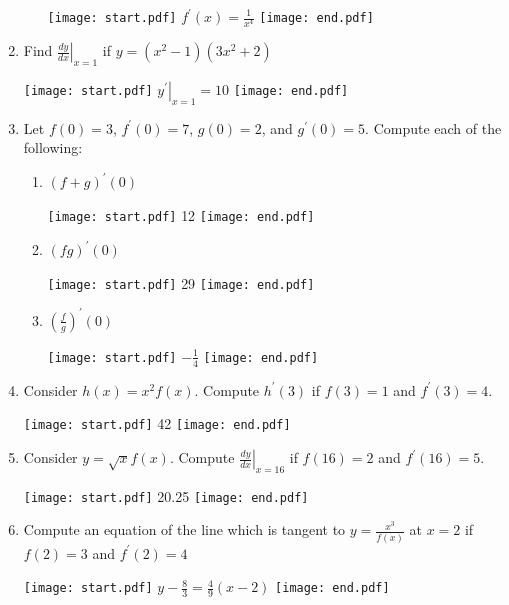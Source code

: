 \documentclass[12pt]{article}
\begin{document}
\begin{enumerate}
\begin{enumerate}
\texttt{[image: start.pdf]}
{{$\displaystyle f^{\prime}(x)=\frac{1}{x^4}$}}
\texttt{[image: end.pdf]}


\end{enumerate}

\item Find $\displaystyle \left.\frac{dy}{dx}\right|_{x=1}$ if $y=(x^2-1)(3x^2+2)$

\texttt{[image: start.pdf]}
{{$\displaystyle \left.y^{\prime}\right|_{x=1}=10$}}
\texttt{[image: end.pdf]}


\item Let $f(0)=3$, $f^{\prime}(0)=7$, $g(0)=2$, and $g^{\prime}(0)=5$.  Compute each of the following:

\begin{enumerate}

\item $\left(f+g\right)^{\prime}(0)$

\texttt{[image: start.pdf]}
{{12}}
\texttt{[image: end.pdf]}


\item $\left(fg \right)^{\prime}(0)$

\texttt{[image: start.pdf]}
{{29}}
\texttt{[image: end.pdf]}


\item $\displaystyle \left(\frac{f}{g}\right)^{\prime}(0)$

\texttt{[image: start.pdf]}
{{$\displaystyle -\frac{1}{4}$}}
\texttt{[image: end.pdf]}


\end{enumerate}

\item Consider $h(x)=x^2f(x)$.  Compute $h^{\prime}(3)$ if $f(3)=1$ and $f^{\prime}(3)=4$.

\texttt{[image: start.pdf]}
{{42}}
\texttt{[image: end.pdf]}


\item Consider $y=\sqrt{x}f(x)$.  Compute $\displaystyle \left.\frac{dy}{dx}\right|_{x=16}$ if $f(16)=2$ and $f^{\prime}(16)=5$.

\texttt{[image: start.pdf]}
{{20.25}}
\texttt{[image: end.pdf]}


\item Compute an equation of the line which is tangent to $\displaystyle y=\frac{x^3}{f(x)}$ at $x=2$ if $f(2)=3$ and $f^{\prime}(2)=4$

\texttt{[image: start.pdf]}
{{$\displaystyle y-\frac{8}{3}=\frac{4}{9}(x-2)$}}
\texttt{[image: end.pdf]}



\end{enumerate}
\end{document}
